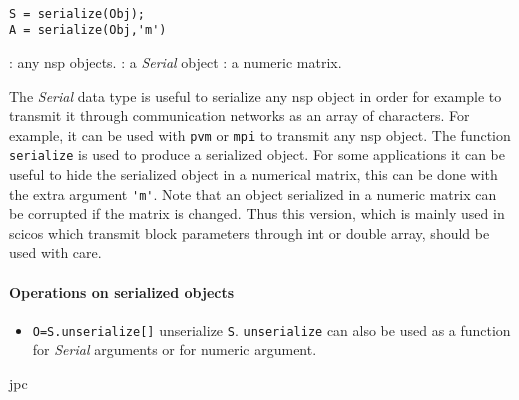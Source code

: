 
\begin{mandesc}
   \\
\end{mandesc}
\begin{calling_sequence}
\begin{verbatim}
S = serialize(Obj);
A = serialize(Obj,'m')
\end{verbatim}
\end{calling_sequence}
\begin{parameters}
  \begin{varlist}
    :  any nsp objects. 
    : a \emph{Serial} object 
    : a numeric matrix.
  \end{varlist}
\end{parameters}

\begin{mandescription}
The \emph{Serial} data type is useful to serialize any nsp object in order 
for example to transmit it through communication networks as an array of 
characters. For example, it can be used with \verb+pvm+ or \verb+mpi+ to transmit any 
nsp object. The function \verb+serialize+ is used to produce a serialized object. 
For some applications it can be useful to hide the serialized object in a 
numerical matrix, this can be done with the extra argument \verb+'m'+. Note 
that an object serialized in a numeric matrix can be corrupted if 
the matrix is changed. Thus this version, which is mainly used in scicos 
which transmit block parameters through int or double array, should be used with care. 
\end{mandescription}

\paragraph{Operations on serialized objects}
\begin{itemize}
   \item \verb+O=S.unserialize[]+ unserialize \verb+S+. \verb+unserialize+ can 
     also be used as a function for \emph{Serial} arguments or for numeric 
     argument.
\end{itemize}

\begin{examples}
  \begin{program}
  \end{program}
 \end{examples}

\begin{manseealso}

\end{manseealso}

\begin{authors}
   jpc
\end{authors}
